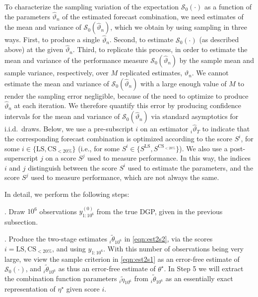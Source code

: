 \documentclass[12pt]{article}
\theoremstyle{definition}
\theoremstyle{remark}
\begin{document}
To characterize the sampling variation of the expectation $\mathcal{S}_0(\cdot)$ as a function of the parameters $\hat{\vartheta}_n$ of the estimated forecast combination, we need estimates of the mean and variance of $\mathcal{S}_0(\hat{\vartheta}_n)$, which we obtain by using sampling in three ways. First, to produce a single $\hat{\vartheta}_n$. Second, to estimate $\mathcal{S}_0(\cdot)$ (as described above) at the given $\hat{\vartheta}_n$. Third, to replicate this process, in order to estimate the mean and variance of the performance measure $\mathcal{S}_0(\hat{\vartheta}_n)$ by the sample mean and sample variance, respectively, over $M$ replicated estimates, $\hat{\vartheta}_n$. We cannot estimate the mean and variance of $\mathcal{S}_0(\hat{\vartheta}_n)$ with a large enough value of $M$ to render the sampling error negligible, because of the need to optimize to produce $\hat{\vartheta}_n$ at each iteration. We therefore quantify this error by producing confidence intervals for the mean and variance of $\mathcal{S}_0(\hat{\vartheta}_n)$ via standard asymptotics for i.i.d.\ draws. Below, we use a pre-subscript $i$ on an estimator ${}_i \hat{\vartheta}_T$ to indicate that the corresponding forecast combination is optimized according to the score $S^i$, for some $i \in \{\mathrm{LS}, \mathrm{CS}_{<20\%}\}$ (i.e., for some $S^i \in \{S^{\mathrm{LS}}, S^{\mathrm{CS}_{<20\%}}\}$). We also use a post-superscript $j$ on a score $S^j$ used to measure performance. In this way, the indices $i$ and $j$ distinguish between the score $S^i$ used to estimate the parameters, and the score $S^j$ used to measure performance, which are not always the same.

In detail, we perform the following steps:

\medskip

. Draw $10^6$ observations $y^{(0)}_{1:10^6}$ from the true DGP, given in the previous subsection.

\medskip

. Produce the two-stage estimates ${}_{i}\tilde{\theta}_{10^{6}}$ in \eqref{eqn:est2s2}, via the scores $i=\mathrm{LS},\mathrm{CS}_{<20\%}$, and using $y_{1:10^{6}}$. With this number of observations being very large, we view the sample criterion in \eqref{eqn:est2s1} as an error-free estimate of $\mathcal{S}_{0}(\cdot )$, and ${}_{i}\tilde{\theta}_{10^{6}}$ as thus an error-free estimate of $\theta ^{\star }$. In Step 5 we will extract the combination function parameters ${}_{i}\tilde{\eta}_{10^{6}}$ from ${}_{i}\tilde{\theta}_{10^{6}}$ as an essentially exact representation of $\eta ^{\star }$ given score $i$.
\end{document}
